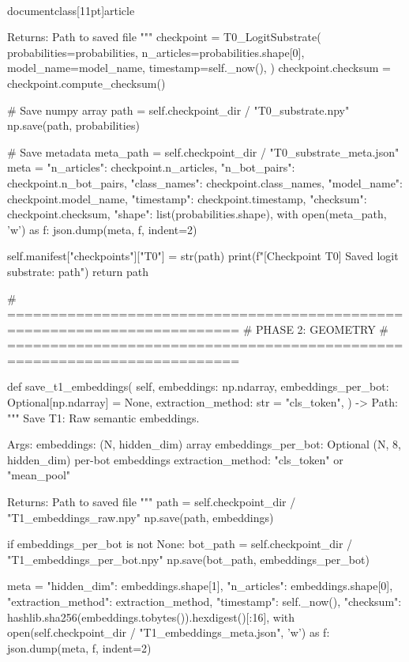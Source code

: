 \\documentclass[11pt]{article}
\begin{document}
\begin{CodeBlock}
        Returns:
            Path to saved file
        """
        checkpoint = T0_LogitSubstrate(
            probabilities=probabilities,
            n_articles=probabilities.shape[0],
            model_name=model_name,
            timestamp=self._now(),
        )
        checkpoint.checksum = checkpoint.compute_checksum()

        # Save numpy array
        path = self.checkpoint_dir / "T0_substrate.npy"
        np.save(path, probabilities)

        # Save metadata
        meta_path = self.checkpoint_dir / "T0_substrate_meta.json"
        meta = {
            "n_articles": checkpoint.n_articles,
            "n_bot_pairs": checkpoint.n_bot_pairs,
            "class_names": checkpoint.class_names,
            "model_name": checkpoint.model_name,
            "timestamp": checkpoint.timestamp,
            "checksum": checkpoint.checksum,
            "shape": list(probabilities.shape),
        }
        with open(meta_path, 'w') as f:
            json.dump(meta, f, indent=2)

        self.manifest["checkpoints"]["T0"] = str(path)
        print(f"[Checkpoint T0] Saved logit substrate: {path}")
        return path

    # =========================================================================
    # PHASE 2: GEOMETRY
    # =========================================================================

    def save_t1_embeddings(
        self,
        embeddings: np.ndarray,
        embeddings_per_bot: Optional[np.ndarray] = None,
        extraction_method: str = "cls_token",
    ) -> Path:
        """
        Save T1: Raw semantic embeddings.

        Args:
            embeddings: (N, hidden_dim) array
            embeddings_per_bot: Optional (N, 8, hidden_dim) per-bot embeddings
            extraction_method: "cls_token" or "mean_pool"

        Returns:
            Path to saved file
        """
        path = self.checkpoint_dir / "T1_embeddings_raw.npy"
        np.save(path, embeddings)

        if embeddings_per_bot is not None:
            bot_path = self.checkpoint_dir / "T1_embeddings_per_bot.npy"
            np.save(bot_path, embeddings_per_bot)

        meta = {
            "hidden_dim": embeddings.shape[1],
            "n_articles": embeddings.shape[0],
            "extraction_method": extraction_method,
            "timestamp": self._now(),
            "checksum": hashlib.sha256(embeddings.tobytes()).hexdigest()[:16],
        }
        with open(self.checkpoint_dir / "T1_embeddings_meta.json", 'w') as f:
            json.dump(meta, f, indent=2)


\end{CodeBlock}
\end{document}
